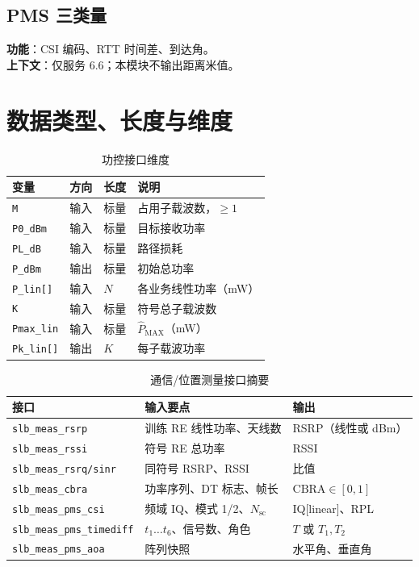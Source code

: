 \documentclass[11pt,a4paper]{ctexart}
\begin{document}
\subsection{PMS 三类量}

\textbf{功能}：CSI 编码、RTT 时间差、到达角。\\
\textbf{上下文}：仅服务 6.6；本模块不输出距离米值。

\section{数据类型、长度与维度}

\begin{longtable}{L{3.2cm}L{2.2cm}L{2.2cm}L{6.5cm}}
\caption{功控接口维度\label{tab:6545-dim-pwr}} \\
\toprule
\textbf{变量} & \textbf{方向} & \textbf{长度} & \textbf{说明} \\
\midrule
\texttt{M} & 输入 & 标量 & 占用子载波数，$\geq 1$ \\
\texttt{P0\_dBm} & 输入 & 标量 & 目标接收功率 \\
\texttt{PL\_dB} & 输入 & 标量 & 路径损耗 \\
\texttt{P\_dBm} & 输出 & 标量 & 初始总功率 \\
\texttt{P\_lin[]} & 输入 & $N$ & 各业务线性功率（mW） \\
\texttt{K} & 输入 & 标量 & 符号总子载波数 \\
\texttt{Pmax\_lin} & 输入 & 标量 & $\hat{P}_{\mathrm{MAX}}$（mW） \\
\texttt{Pk\_lin[]} & 输出 & $K$ & 每子载波功率 \\
\bottomrule
\end{longtable}

\begin{longtable}{L{3.5cm}L{4.5cm}L{6cm}}
\caption{通信/位置测量接口摘要\label{tab:6545-dim-meas}} \\
\toprule
\textbf{接口} & \textbf{输入要点} & \textbf{输出} \\
\midrule
\texttt{slb\_meas\_rsrp} & 训练 RE 线性功率、天线数 & RSRP（线性或 dBm） \\
\texttt{slb\_meas\_rssi} & 符号 RE 总功率 & RSSI \\
\texttt{slb\_meas\_rsrq/sinr} & 同符号 RSRP、RSSI & 比值 \\
\texttt{slb\_meas\_cbra} & 功率序列、DT 标志、帧长 & $\mathrm{CBRA}\in[0,1]$ \\
\texttt{slb\_meas\_pms\_csi} & 频域 IQ、模式 1/2、$N_{\mathrm{sc}}$ & IQ[linear]、RPL \\
\texttt{slb\_meas\_pms\_timediff} & $t_1\ldots t_6$、信号数、角色 & $T$ 或 $T_1,T_2$ \\
\texttt{slb\_meas\_pms\_aoa} & 阵列快照 & 水平角、垂直角 \\
\bottomrule
\end{longtable}
\end{document}
